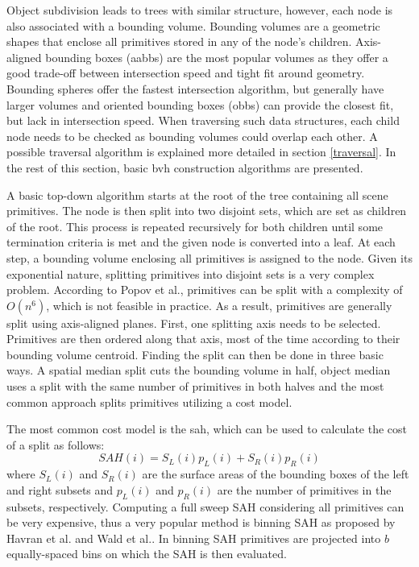 Object subdivision leads to trees with similar structure, however, each node is also associated with a bounding volume. Bounding volumes are a geometric shapes that enclose all primitives stored in any of the node's children. Axis-aligned bounding boxes (\acrshort{aabb}s) are the most popular volumes as they offer a good trade-off between intersection speed and tight fit around geometry. Bounding spheres offer the fastest intersection algorithm, but generally have larger volumes and oriented bounding boxes (\acrshort{obb}s) can provide the closest fit, but lack in intersection speed. When traversing such data structures, each child node needs to be checked as bounding volumes could overlap each other. A possible traversal algorithm is explained more detailed in section \ref{traversal}. In the rest of this section, basic \acrfull{bvh} construction algorithms are presented. 

A basic top-down algorithm starts at the root of the tree containing all scene primitives. The node is then split into two disjoint sets, which are set as children of the root. This process is repeated recursively for both children until some termination criteria is met and the given node is converted into a leaf. At each step, a bounding volume enclosing all primitives is assigned to the node. Given its exponential nature, splitting primitives into disjoint sets is a very complex problem. According to Popov et al.\cite{popov09harmful}, primitives can be split with a complexity of $O(n^6)$, which is not feasible in practice. As a result, primitives are generally split using axis-aligned planes. First, one splitting axis needs to be selected. Primitives are then ordered along that axis, most of the time according to their bounding volume centroid. Finding the split can then be done in three basic ways. A spatial median split cuts the bounding volume in half, object median uses a split with the same number of primitives in both halves and the most common approach splits primitives utilizing a cost model. 

The most common cost model is the \acrfull{sah}\cite{goldsmith_automatic_1987,macdonald_heuristics_1990}, which can be used to calculate the cost of a split as follows:
\[
    SAH(i)=S_L(i)p_L(i)+S_R(i)p_R(i)
\]
where $S_L(i)$ and $S_R(i)$ are the surface areas of the bounding boxes of the left and right subsets and $p_L(i)$ and $p_R(i)$ are the number of primitives in the subsets, respectively. Computing a full sweep SAH considering all primitives can be very expensive, thus a very popular method is binning SAH as proposed by Havran et al.\cite{havran06sahbin} and Wald et al.\cite{wald07fastConstruction}. In binning SAH primitives are projected into $b$ equally-spaced bins on which the SAH is then evaluated. 


